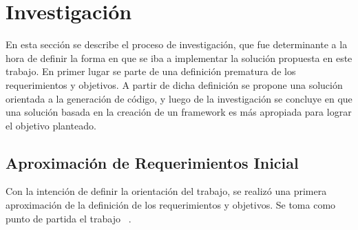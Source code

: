 \section{Investigación}
En esta sección se describe el proceso de investigación, que fue determinante a
la hora de definir la forma en que se iba a implementar la solución propuesta en
este trabajo.
En primer lugar se parte de una definición  prematura de los requerimientos y
objetivos. A partir de dicha definición se propone  una solución orientada a la
generación de código, y luego de la investigación se concluye en que una
solución basada en la creación de un framework es más apropiada para lograr el objetivo planteado.
\subsection{Aproximación de Requerimientos Inicial}
Con la intención de definir la orientación del trabajo, se realizó
una primera aproximación de la definición de los requerimientos y
objetivos.
Se toma como punto de partida el trabajo ~\cite{codegen}.

